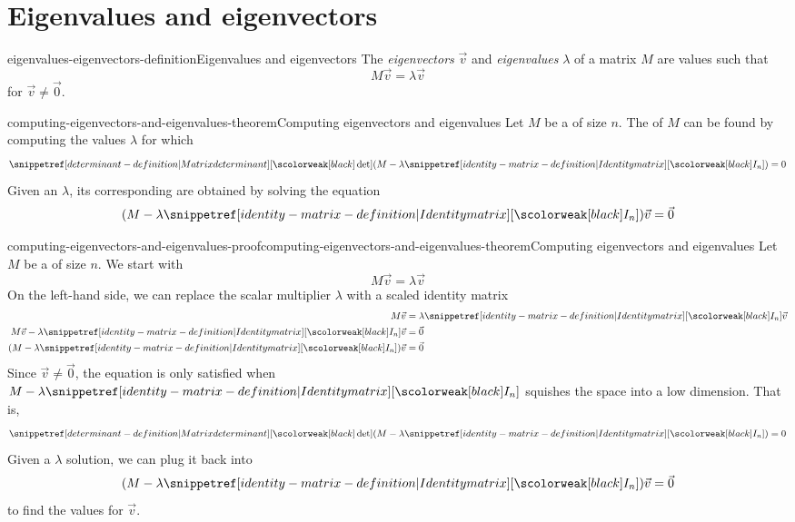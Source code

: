 \documentclass[preview]{standalone}
\begin{document}
\genpage

\section{Eigenvalues and eigenvectors}

\begin{snippetdefinition}{eigenvalues-eigenvectors-definition}{Eigenvalues and eigenvectors}
    The \textit{eigenvectors} \(\vec{v}\) and \textit{eigenvalues} \(\lambda\) of a matrix \(M\)
    are values such that
    \[
        M\vec{v} = \lambda \vec{v}
    \]
    for \(\vec{v}\neq \vec{0}\).
\end{snippetdefinition}


\begin{snippettheorem}{computing-eigenvectors-and-eigenvalues-theorem}{Computing eigenvectors and eigenvalues}
    Let \(M\) be a \matrix of size \(n\).
    The \eigenvalue[eigenvalues] of \(M\) can be found by computing the values \(\lambda\) for which
    \[ \det(M-\lambda \identmatrix{n}) = 0 \]
    Given an \eigenvalue \(\lambda\), its corresponding \eigenvector[eigenvectors] are
    obtained by solving the equation
    \[ (M - \lambda \identmatrix{n})\vec{v} = \vec{0} \]
\end{snippettheorem}

\begin{snippetproof}{computing-eigenvectors-and-eigenvalues-proof}{computing-eigenvectors-and-eigenvalues-theorem}{Computing eigenvectors and eigenvalues}
    Let \(M\) be a \matrix of size \(n\).
    We start with
    \[
        M\vec{v} = \lambda \vec{v}
    \]
    On the left-hand side, we can replace the scalar multiplier \(\lambda\) with
    a scaled identity matrix
    \begin{align*}
        M\vec{v} &= \lambda \identmatrix{n} \vec{v} \\
        M\vec{v} - \lambda \identmatrix{n} \vec{v} &= \vec{0} \\
        (M - \lambda \identmatrix{n})\vec{v} &= \vec{0}
    \end{align*}
    Since \(\vec{v} \neq \vec{0}\), the equation is only satisfied
    when \(M - \lambda \identmatrix{n}\) squishes the space into a low dimension. That is,
    \[ \det(M-\lambda \identmatrix{n}) = 0 \]
    Given a \(\lambda\) solution, we can plug it back into
    \[ (M - \lambda \identmatrix{n})\vec{v} = \vec{0} \] to find the values for \(\vec{v}\).
\end{snippetproof}
\end{document}

